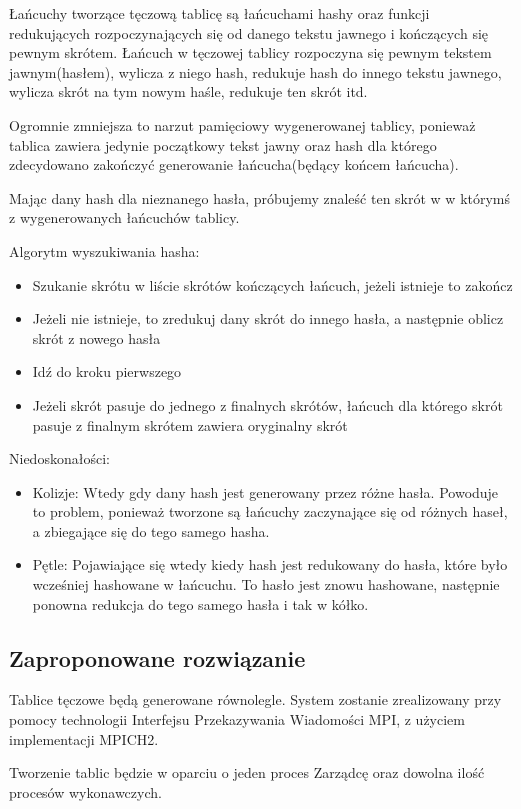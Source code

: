 \documentclass[a4paper,11pt]{article}
\begin{document}
Łańcuchy tworzące tęczową tablicę są łańcuchami hashy oraz funkcji redukujących rozpoczynających się od danego tekstu jawnego i kończących się pewnym skrótem. Łańcuch w tęczowej tablicy rozpoczyna się pewnym tekstem jawnym(hasłem), wylicza z niego hash, redukuje hash do innego tekstu jawnego, wylicza skrót na tym nowym haśle, redukuje ten skrót itd.

Ogromnie zmniejsza to narzut pamięciowy wygenerowanej tablicy, ponieważ tablica zawiera jedynie początkowy tekst jawny oraz hash dla którego zdecydowano zakończyć generowanie łańcucha(będący końcem łańcucha).

Mając dany hash dla nieznanego hasła, próbujemy znaleść ten skrót w w którymś z wygenerowanych łańcuchów tablicy.

Algorytm wyszukiwania hasha:
\begin{itemize}
  \item Szukanie skrótu w liście skrótów kończących łańcuch, jeżeli istnieje to zakończ
  \item Jeżeli nie istnieje, to zredukuj dany skrót do innego hasła, a następnie oblicz skrót z nowego hasła
  \item Idź do kroku pierwszego
  \item Jeżeli skrót pasuje do jednego z finalnych skrótów, łańcuch dla którego skrót pasuje z finalnym skrótem zawiera oryginalny skrót
\end{itemize}

Niedoskonałości:
\begin{itemize}
  \item Kolizje: Wtedy gdy dany hash jest generowany przez różne hasła. Powoduje to problem, ponieważ tworzone są łańcuchy zaczynające się od różnych haseł, a zbiegające się do tego samego hasha.
  \item Pętle: Pojawiające się wtedy kiedy hash jest redukowany do hasła, które było wcześniej hashowane w łańcuchu. To hasło jest znowu hashowane, następnie ponowna redukcja do tego samego hasła i tak w kółko.
\end{itemize}

\subsection{Zaproponowane rozwiązanie}
Tablice tęczowe będą generowane równolegle. System zostanie zrealizowany przy pomocy technologii Interfejsu Przekazywania Wiadomości MPI, z użyciem implementacji MPICH2.

Tworzenie tablic będzie w oparciu o jeden proces Zarządcę oraz dowolna ilość procesów wykonawczych. 
\end{document}
